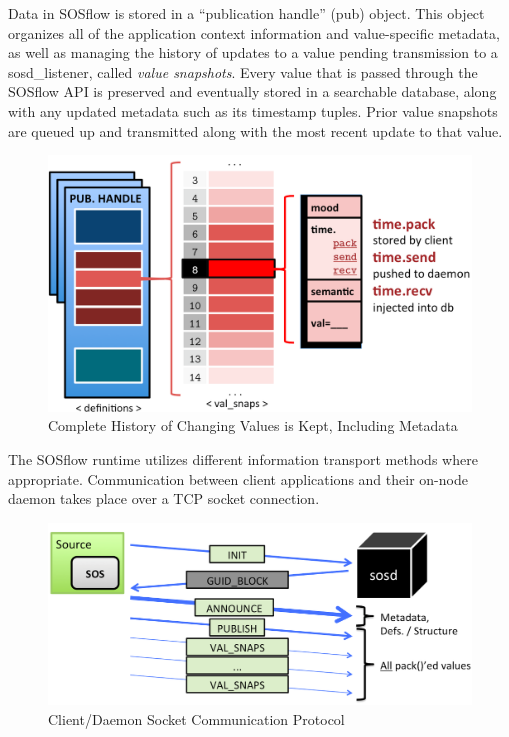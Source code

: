 
Data in SOSflow is stored in a ``publication handle'' (pub) object.
%
This object organizes all of the application context information and
value-specific metadata, as well as managing the history of updates to
a value pending transmission to a sosd\_listener, called
\textit{value snapshots}.
%
Every value that is passed through the SOSflow API is preserved and
eventually stored in a searchable database, along with any updated
metadata such as its timestamp tuples.
%
%
Prior value snapshots are queued up and transmitted along
with the most recent update to that value.
\begin{figure}[h]
\centering
\includegraphics[width=\columnwidth]{images/val_snaps.png}
\caption{Complete History of Changing Values is Kept, Including Metadata}
\label{fig_val_snaps}
\end{figure}
%
\par
%
The SOSflow runtime utilizes different information transport methods
where appropriate.
%
Communication between client applications and their on-node daemon
takes place over a TCP socket connection.
%
\begin{figure}[h]
\centering
\includegraphics[width=\columnwidth]{images/sosd_protocol.png}
\caption{Client/Daemon Socket Communication Protocol}
\label{fig_sosd_protocol}
\end{figure}
